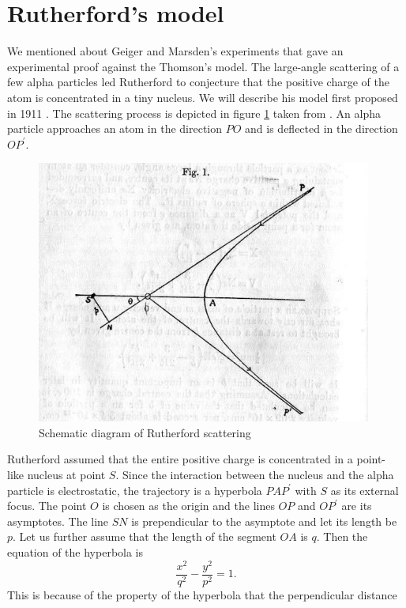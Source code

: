 \section{Rutherford's model}\label{c3e2}
We mentioned about Geiger and Marsden's experiments that gave an experimental
proof against the Thomson's model. The large-angle scattering of a few alpha
particles led Rutherford to conjecture that the positive charge of the atom
is concentrated in a tiny nucleus. We will describe his model first proposed in
1911 \cite{rutherform1911scattering}. The scattering process is depicted in
figure \ref{c3f1} taken from \cite{rutherform1911scattering}. An alpha particle
approaches an atom in the direction $PO$ and is deflected in the direction 
$OP^\prime$.
\begin{figure}
\begin{center}
\includegraphics{rutherford-scattering}
\caption{Schematic diagram of Rutherford scattering}\label{c3f1}
\end{center}
\end{figure}
Rutherford assumed that the entire positive charge is concentrated in a point-
like nucleus at point $S$. Since the interaction between the nucleus and the
alpha particle is electrostatic, the trajectory is a hyperbola $PAP^\prime$ with
$S$ as its external focus. The point $O$ is chosen as the origin and the lines
$OP$ and $OP^\prime$ are its asymptotes. The line $SN$ is prependicular to the
asymptote and let its length be $p$. Let us further assume that the length of
the segment $OA$ is $q$. Then the equation of the hyperbola is
\begin{equation}\label{c3s2e1}
\frac{x^2}{q^2} - \frac{y^2}{p^2} = 1.
\end{equation}
This is because of the property of the hyperbola that the perpendicular distance
